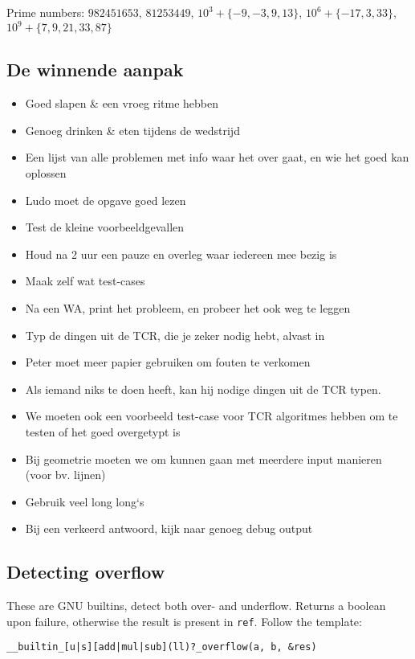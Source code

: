 \documentclass{article}
\begin{document}
Prime numbers: $\mathit{982451653}$, $\mathit{81253449}$, $10^3 + \{-9,-3,9,13\}$, $10^6 + \{-17, 3, 33\}$, $10^9 + \{7,9,21,33,87\}$

\subsection{De winnende aanpak}

\begin{itemize}
	\setlength\itemsep{-.25em}
	\item Goed slapen \& een vroeg ritme hebben
	\item Genoeg drinken \& eten tijdens de wedstrijd
	\item Een lijst van alle problemen met info waar het over gaat, en wie het goed kan oplossen
	\item Ludo moet de opgave goed lezen
	\item Test de kleine voorbeeldgevallen
	\item Houd na 2 uur een pauze en overleg waar iedereen mee bezig is
	\item Maak zelf wat test-cases
	\item Na een WA, print het probleem, en probeer het ook weg te leggen
	\item Typ de dingen uit de TCR, die je zeker nodig hebt, alvast in
	\item Peter moet meer papier gebruiken om fouten te verkomen
	\item Als iemand niks te doen heeft, kan hij nodige dingen uit de TCR typen.
	\item We moeten ook een voorbeeld test-case voor TCR algoritmes hebben om te testen of het goed overgetypt is
	\item Bij geometrie moeten we om kunnen gaan met meerdere input manieren (voor bv. lijnen)
	\item Gebruik veel long long`s
	\item Bij een verkeerd antwoord, kijk naar genoeg debug output
\end{itemize}

\subsection{Detecting overflow}
These are GNU builtins, detect both over- and underflow. Returns a boolean upon failure, otherwise the result is present in \texttt{ref}. Follow the template: 

\texttt{\_\_builtin\_[u|s][add|mul|sub](ll)?\_overflow(a, b, \&res)} 
\end{document}
